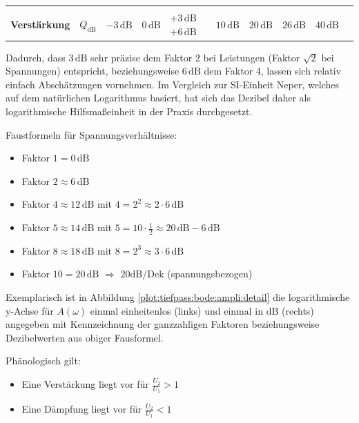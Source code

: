 \begin{frame}
{\begin{table}[H]
\begin{tabular}{ |l c|g|c|g|c|g|c|g|c| }
            \hline &&&&&&&&&\\[-10pt]
                \textbf{Verstärkung}    & $Q_{\mathrm{dB}}$ &
                $-3\,\mathrm{dB}$ 		& $0\,\mathrm{dB}$ 	& $+3\,\mathrm{dB}$  $+6\,\mathrm{dB}$  & $10\,\mathrm{dB}$ & $20\,\mathrm{dB}$ & $26\,\mathrm{dB}$	& $40\,\mathrm{dB}$ \\[+3pt]
            \hline
        \end{tabular}
    \end{table}%
    Dadurch, dass $3\,\mathrm{dB}$ sehr präzise dem Faktor $2$ bei Leistungen (Faktor $\sqrt{2}$ bei Spannungen) entspricht, 
    beziehungsweise $6\,\mathrm{dB}$ dem Faktor $4$, lassen sich relativ einfach Abschätzungen vornehmen.
    Im Vergleich zur SI-Einheit Neper, welches auf dem natürlichen Logarithmus basiert, 
    hat sich das Dezibel daher als logarithmische Hilfsmaßeinheit in der Praxis durchgesetzt.

    Faustformeln für Spannungsverhältnisse: 
    \begin{itemize}
        \item Faktor $1 = 0\,\mathrm{dB}$
        \item Faktor $2 \approx 6\,\mathrm{dB}$
        \item Faktor $4 \approx 12\,\mathrm{dB}$ \quad mit \quad $4 = 2^2 \approx 2\cdot 6\,\mathrm{dB}$
        \item Faktor $5 \approx 14\,\mathrm{dB}$ \quad mit \quad $5 = 10 \cdot \frac{1}{2} \approx 20\,\mathrm{dB} - 6\,\mathrm{dB}$
        \item Faktor $8 \approx 18\,\mathrm{dB}$ \quad mit \quad $8=2^3 \approx 3\cdot 6\,\mathrm{dB}$
        \item Faktor $10 = 20\,\mathrm{dB}$ \quad $\Longrightarrow$ \quad $20 \mathrm{dB} / \mathrm{Dek}$ (spannungsbezogen)
    \end{itemize}    
    
    Exemplarisch ist in Abbildung \ref{plot:tiefpass:bode:ampli:detail} die logarithmische y-Achse für $A(\omega)$ 
    einmal einheitenlos (links) und einmal in $\mathrm{dB}$ (rechts) angegeben mit Kennzeichnung der ganzzahligen Faktoren 
    beziehungsweise Dezibelwerten aus obiger Fausformel.
    
    Phänologisch gilt:
    \begin{itemize}
        \item Eine Verstärkung liegt vor für $\frac{U_2}{U_1}>1$
        \item Eine Dämpfung liegt vor für $\frac{U_2}{U_1}<1$
    \end{itemize}
    
}
\end{frame}
